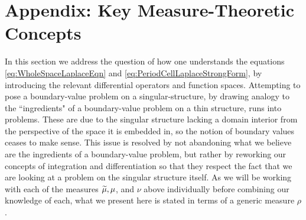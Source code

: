 \section{Appendix: Key Measure-Theoretic Concepts} \label{app:MeasureTheory}
In this section we address the question of how one understands the equations \eqref{eq:WholeSpaceLaplaceEqn} and \eqref{eq:PeriodCellLaplaceStrongForm}, by introducing the relevant differential operators and function spaces.
Attempting to pose a boundary-value problem on a singular-structure, by drawing analogy to the ``ingredients" of a boundary-value problem on a thin structure, runs into problems.
These are due to the singular structure lacking a domain interior from the perspective of the space it is embedded in, so the notion of boundary values ceases to make sense.
This issue is resolved by not abandoning what we believe are the ingredients of a boundary-value problem, but rather by reworking our concepts of integration and differentiation so that they respect the fact that we are looking at a problem on the singular structure itself.
As we will be working with each of the measures $\widetilde{\mu}, \mu$, and $\nu$ above individually before combining our knowledge of each, what we present here is stated in terms of a generic measure $\rho$.


